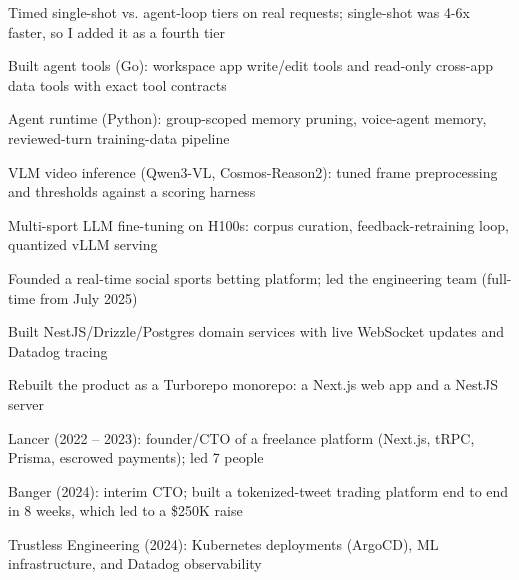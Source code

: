 \documentclass[print]{jack-resume}
\begin{document}
\begin{tightemize}
    \item Timed single-shot vs. agent-loop tiers on real requests; single-shot was 4-6x faster, so I added it as a fourth tier
    \item Built agent tools (Go): workspace app write/edit tools and read-only cross-app data tools with exact tool contracts
    \item Agent runtime (Python): group-scoped memory pruning, voice-agent memory, reviewed-turn training-data pipeline
    \item VLM video inference (Qwen3-VL, Cosmos-Reason2): tuned frame preprocessing and thresholds against a scoring harness
    \item Multi-sport LLM fine-tuning on H100s: corpus curation, feedback-retraining loop, quantized vLLM serving
\end{tightemize}
\sectionsep

\begin{tightemize}
    \item Founded a real-time social sports betting platform; led the engineering team (full-time from July 2025)
    \item Built NestJS/Drizzle/Postgres domain services with live WebSocket updates and Datadog tracing
    \item Rebuilt the product as a Turborepo monorepo: a Next.js web app and a NestJS server
\end{tightemize}
\sectionsep

\begin{tightemize}
    \item Lancer (2022 -- 2023): founder/CTO of a freelance platform (Next.js, tRPC, Prisma, escrowed payments); led 7 people
    \item Banger (2024): interim CTO; built a tokenized-tweet trading platform end to end in 8 weeks, which led to a \$250K raise
    \item Trustless Engineering (2024): Kubernetes deployments (ArgoCD), ML infrastructure, and Datadog observability
\end{tightemize}
\sectionsep
\end{document}

